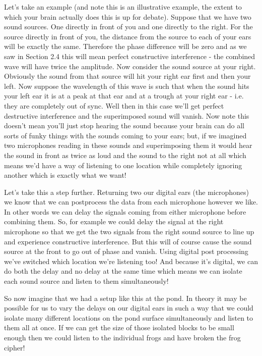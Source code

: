 \documentclass[10pt,a4paper]{article}
\begin{document}
Let's take an example (and note this is an illustrative example, the extent to which your brain actually does this is up for debate). Suppose that we have two sound sources. One directly in front of you and one directly to the right. For the source directly in front of you, the distance from the source to each of your ears will be exactly the same. Therefore the phase difference will be zero and as we saw in Section 2.4 this will mean perfect constructive interference - the combined wave will have twice the amplitude. Now consider the sound source at your right. Obviously the sound from that source will hit your right ear first and then your left. Now suppose the wavelength of this wave is such that when the sound hits your left ear it is at a peak at that ear and at a trough at your right ear - i.e. they are completely out of sync. Well then in this case we'll get perfect destructive interference and the superimposed sound will vanish. Now note this doesn't mean you'll just stop hearing the sound because your brain can do all sorts of funky things with the sounds coming to your ears; but, if we imagined two microphones reading in these sounds and superimposing them it would hear the sound in front as twice as loud and the sound to the right not at all which means we'd have a way of listening to one location while completely ignoring another which is exactly what we want!

Let's take this a step further. Returning two our digital ears (the microphones) we know that we can postprocess the data from each microphone however we like. In other words we can delay the signals coming from either microphone before combining them. So, for example we could delay the signal at the right microphone so that we get the two signals from the right sound source to line up and experience constructive interference. But this will of course cause the sound source at the front to go out of phase and vanish. Using digital post processing we've switched which location we're listening too! And because it's digital, we can do both the delay and no delay at the same time which means we can isolate each sound source and listen to them simultaneously! 

So now imagine that we had a setup like this at the pond. In theory it may be possible for us to vary the delays on our digital ears in such a way that we could isolate many different locations on the pond surface simultaneously and listen to them all at once. If we can get the size of those isolated blocks to be small enough then we could listen to the individual frogs and have broken the frog cipher! 
\end{document}
